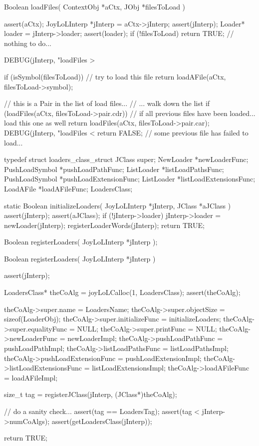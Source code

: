 \starttyping
Boolean loadFiles(
  ContextObj *aCtx,
  JObj   *filesToLoad
) {
  assert(aCtx);
  JoyLoLInterp *jInterp = aCtx->jInterp;
  assert(jInterp);
  Loader* loader = jInterp->loader;
  assert(loader);
  if (!filesToLoad) return TRUE; // nothing to do...

  DEBUG(jInterp, "loadFiles > %

  if (isSymbol(filesToLoad)) { // try to load this file
    return loadAFile(aCtx, filesToLoad->symbol);
  }

  // this is a Pair in the list of load files...
  // ... walk down the list
  if (loadFiles(aCtx, filesToLoad->pair.cdr)) {
    // if all previous files have been loaded... load this one as well
    return loadFiles(aCtx, filesToLoad->pair.car);
  }
  DEBUG(jInterp, "loadFiles < %
  return FALSE; // some previous file has failed to load...
}
\stoptyping

\startTestSuite[regiserLoaders]

\startCHeader
typedef struct loaders_class_struct {
  JClass      super;
  NewLoader      *newLoaderFunc;
  PushLoadSymbol *pushLoadPathFunc;
  ListLoader     *listLoadPathsFunc;
  PushLoadSymbol *pushLoadExtensionFunc;
  ListLoader     *listLoadExtensionsFunc;
  LoadAFile      *loadAFileFunc;
} LoadersClass;
\stopCHeader

\startCCode
static Boolean initializeLoaders(
  JoyLoLInterp *jInterp,
  JClass   *aJClass
) {
  assert(jInterp);
  assert(aJClass);
  if (!jInterp->loader) {
    jInterp->loader = newLoader(jInterp);
  }
  registerLoaderWords(jInterp);
  return TRUE;
}
\stopCCode

\startCHeader
Boolean registerLoaders(
  JoyLoLInterp *jInterp
);
\stopCHeader
{}

\startCCode
Boolean registerLoaders(
  JoyLoLInterp *jInterp
) {
  assert(jInterp);
  
  LoadersClass* theCoAlg =
    joyLoLCalloc(1, LoadersClass);
  assert(theCoAlg);
  
  theCoAlg->super.name             = LoadersName;
  theCoAlg->super.objectSize       = sizeof(LoaderObj);
  theCoAlg->super.initializeFunc   = initializeLoaders;
  theCoAlg->super.equalityFunc     = NULL;
  theCoAlg->super.printFunc        = NULL;
  theCoAlg->newLoaderFunc          = newLoaderImpl;
  theCoAlg->pushLoadPathFunc       = pushLoadPathImpl;
  theCoAlg->listLoadPathsFunc      = listLoadPathsImpl;
  theCoAlg->pushLoadExtensionFunc  = pushLoadExtensionImpl;
  theCoAlg->listLoadExtensionsFunc = listLoadExtensionsImpl;
  theCoAlg->loadAFileFunc          = loadAFileImpl;

  size_t tag =
    registerJClass(jInterp, (JClass*)theCoAlg);
  
  // do a sanity check...
  assert(tag == LoadersTag);
  assert(tag < jInterp->numCoAlgs);
  assert(getLoadersClass(jInterp));

  return TRUE;
}
\stopCCode

